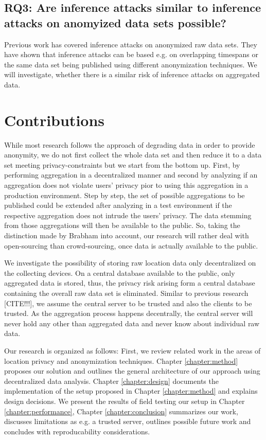 \subsection*{RQ3: Are inference attacks similar to inference attacks on anomyized data sets possible?}
Previous work has covered inference attacks on anonymized raw data sets. They have shown that inference attacks can be based e.g. on overlapping timespans or the same data set being published using different anonymization techniques. We will investigate, whether there is a similar risk of inference attacks on aggregated data.

\section{Contributions}
While most research follows the approach of degrading data in order to provide anonymity, we do not first collect the whole data set and then reduce it to a data set meeting privacy-constraints but we start from the bottom up. First, by performing aggregation in a decentralized manner and second by analyzing if an aggregation does not violate users' privacy pior to using this aggregation in a production environment. Step by step, the set of possible aggregations to be published could be extended after analyzing in a test environment if the respective aggregation does not intrude the users' privacy. The data stemming from those aggregations will then be available to the public. So, taking the distinction made by Brabham \parencite{brabham2008crowdsourcing} into account, our research will rather deal with open-sourcing than crowd-sourcing, once data is actually available to the public.

We investigate the possibility of storing raw location data only decentralized on the collecting devices. On a central database available to the public, only aggregated data is stored, thus, the privacy risk arising form a central database containing the overall raw data set is eliminated. Similar to previous research [CITE!!!], we assume the central server to be trusted and also the clients to be trusted. As the aggregation process happens decentrally, the central server will never hold any other than aggregated data and never know about individual raw data. 

Our research is organized as follows: First, we review related work in the areas of location privacy and anonymization techniques.
Chapter \ref{chapter:method} proposes our solution and outlines the general architecture of our approach using decentralized data analysis. Chapter \ref{chapter:design} documents the implementation of the setup proposed in Chapter \ref{chapter:method} and explains design decisions. We present the results of field testing our setup in Chapter \ref{chapter:performance}, Chapter \ref{chapter:conclusion} summarizes our work, discusses limitations as e.g. a trusted server, outlines possible future work and concludes with reproducability considerations.